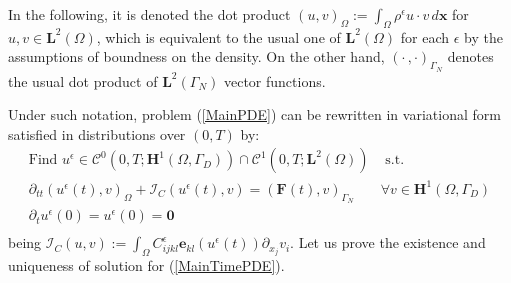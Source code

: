 In the following, it is denoted the dot product $(u,v)_{\Omega} := \int_{\Omega} \rho^{\epsilon} u\cdot v \, d\mathbf{x}$ for $u, v \in \mathbf{L}^2(\Omega)$, which is equivalent to the usual one of $\mathbf{L}^2(\Omega)$ for each $\epsilon$ by the assumptions of boundness on the density. On the other hand, $(\cdot\,, \cdot)_{\Gamma_N}$ denotes the usual dot product of $\mathbf{L}^2(\Gamma_N)$ vector functions.

Under such notation, problem (\ref{MainPDE}) can be rewritten in variational form satisfied in distributions over $(0,T)$ by: 
\begin{equation}
    \label{MainTimePDE}
    \begin{array}{cc}
        \text{Find } u^{\epsilon} \in \mathcal{C}^0 (0,T;\mathbf{H}^1(\Omega,\Gamma_D)) \cap \mathcal{C}^1(0,T;\mathbf{L}^2(\Omega)) & \text{ s.t. }\\
        \partial_{tt} (u^{\epsilon}(t),v)_{\Omega} + \mathcal{I}_{C}(u^{\epsilon}(t),v) = (\mathbf{F}(t),v)_{\Gamma_N}&  \forall v \in \mathbf{H}^1(\Omega,\Gamma_D) \\
        \partial_{t} u^{\epsilon}(0) = u^{\epsilon}(0) = \mathbf{0} & \\
    \end{array}
\end{equation}
being $\mathcal{I}_{C}(u,v) := \int_{\Omega} C_{ijkl}^{\epsilon}\mathbf{e}_{kl}(u^{\epsilon}(t)) \partial_{x_j} v_i$.
Let us prove the existence and uniqueness of solution for (\ref{MainTimePDE}).
